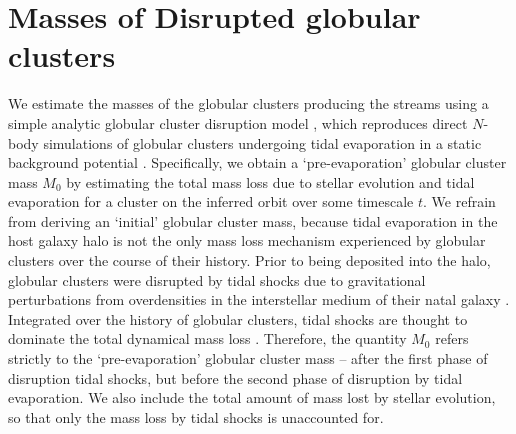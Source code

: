 \documentclass[twocolumn]{aastex63}
\begin{document}
\section{Masses of Disrupted globular clusters}
\label{sec:disrupted}

We estimate the masses of the globular clusters producing the streams using a simple analytic globular cluster disruption model \citep{lamers05}, which reproduces direct $N$-body simulations of globular clusters undergoing tidal evaporation in a static background potential \citep{baumgardt03}. Specifically, we obtain a `pre-evaporation' globular cluster mass $M_0$ by estimating the total mass loss due to stellar evolution and tidal evaporation for a cluster on the inferred orbit over some timescale $t$. We refrain from deriving an `initial' globular cluster mass, because tidal evaporation in the host galaxy halo is not the only mass loss mechanism experienced by globular clusters over the course of their history. Prior to being deposited into the halo, globular clusters were disrupted by tidal shocks due to gravitational perturbations from overdensities in the interstellar medium of their natal galaxy \citep[e.g.][]{gieles06,kruijssen11,miholics17,pfeffer:2018}. Integrated over the history of globular clusters, tidal shocks are thought to dominate the total dynamical mass loss \citep[e.g.][]{kruijssen15b}. Therefore, the quantity $M_0$ refers strictly to the `pre-evaporation' globular cluster mass -- after the first phase of disruption tidal shocks, but before the second phase of disruption by tidal evaporation. We also include the total amount of mass lost by stellar evolution, so that only the mass loss by tidal shocks is unaccounted for.
\end{document}
